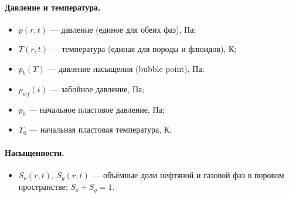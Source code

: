 \documentclass[12pt,a4paper]{article}
\begin{document}
\paragraph{Давление и температура.}
\begin{itemize}[nosep]
  \item $p(r,t)$ --- давление (единое для обеих фаз), Па;
  \item $T(r,t)$ --- температура (единая для породы и флюидов), К;
  \item $p_b(T)$ --- давление насыщения (bubble point), Па;
  \item $p_{wf}(t)$ --- забойное давление, Па;
  \item $p_0$ --- начальное пластовое давление, Па;
  \item $T_0$ --- начальная пластовая температура, К.
\end{itemize}

\paragraph{Насыщенности.}
\begin{itemize}[nosep]
  \item $S_o(r,t)$, $S_g(r,t)$ --- объёмные доли нефтяной и газовой фаз
        в поровом пространстве; $S_o + S_g = 1$.
\end{itemize}
\end{document}
